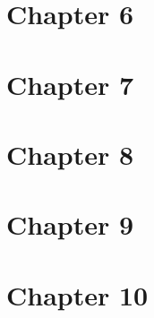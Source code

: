 \documentclass[12pt]{article}
\begin{document}
\section*{Chapter 6}

\section*{Chapter 7}

\section*{Chapter 8}

\section*{Chapter 9}

\section*{Chapter 10}
\end{document}
